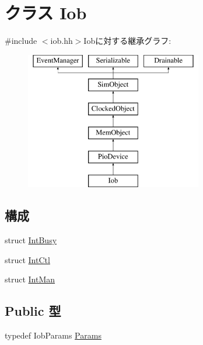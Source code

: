 \hypertarget{classIob}{
\section{クラス Iob}
\label{classIob}
}


{\ttfamily \#include $<$iob.hh$>$}Iobに対する継承グラフ:\begin{figure}[H]
\begin{center}
\leavevmode
\includegraphics[height=6cm]{classIob}
\end{center}
\end{figure}
\subsection*{構成}
\begin{DoxyCompactItemize}
\item 
struct \hyperlink{structIob_1_1IntBusy}{IntBusy}
\item 
struct \hyperlink{structIob_1_1IntCtl}{IntCtl}
\item 
struct \hyperlink{structIob_1_1IntMan}{IntMan}
\end{DoxyCompactItemize}
\subsection*{Public 型}
\begin{DoxyCompactItemize}
\item 
typedef IobParams \hyperlink{classIob_a177ee3cfebf080ab43aa1b8310f520b1}{Params}
\end{DoxyCompactItemize}
